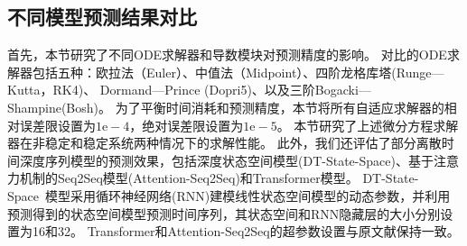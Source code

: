 \subsection{不同模型预测结果对比}
首先，本节研究了不同ODE求解器和导数模块对预测精度的影响。
对比的ODE求解器包括五种：欧拉法（Euler）、中值法（Midpoint）、四阶龙格库塔(Runge—Kutta，RK4)、 Dormand—Prince (Dopri5)\cite{NIPS2018_7892}、以及三阶Bogacki—Shampine(Bosh)\cite{bogacki19893}。
为了平衡时间消耗和预测精度，本节将所有自适应求解器的相对误差限设置为$1\mathrm{e}-4$，绝对误差限设置为$1\mathrm{e}-5$。
本节研究了上述微分方程求解器在非稳定和稳定系统两种情况下的求解性能。
此外，我们还评估了部分离散时间深度序列模型的预测效果，包括深度状态空间模型(DT-State-Space)、基于注意力机制的Seq2Seq模型(Attention-Seq2Seq)\cite{Member2019}和Transformer模型\cite{Wu2020}。
DT-State-Space~\cite{Rangapuram2018}模型采用循环神经网络(RNN)建模线性状态空间模型的动态参数，并利用预测得到的状态空间模型预测时间序列，其状态空间和RNN隐藏层的大小分别设置为16和32。
Transformer和Attention-Seq2Seq的超参数设置与原文献保持一致。

